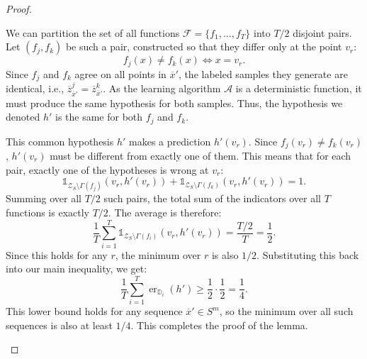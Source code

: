 \begin{proof}
\begin{subproof}
        We can partition the set of all functions $\mathcal{F}=\{f_1, \dots, f_T\}$ into $T/2$ disjoint pairs. Let $(f_j, f_k)$ be such a pair, constructed so that they differ only at the point $v_r$:
        \[
            f_j(x) \neq f_k(x) \iff x = v_r.
        \]
        Since $f_j$ and $f_k$ agree on all points in $\overline{x}'$, the labeled samples they generate are identical, i.e., $\overline{z}_{\overline{x}'}^{j} = \overline{z}_{\overline{x}'}^{k}$. As the learning algorithm $\mathcal{A}$ is a deterministic function, it must produce the same hypothesis for both samples. Thus, the hypothesis we denoted $h'$ is the same for both $f_j$ and $f_k$.

        This common hypothesis $h'$ makes a prediction $h'(v_r)$. Since $f_j(v_r) \neq f_k(v_r)$, $h'(v_r)$ must be different from exactly one of them. This means that for each pair, exactly one of the hypotheses is wrong at $v_r$:
        \[
            \mathds{1}_{\mathcal{Z}_S\setminus\Gamma(f_j)}(v_r, h'(v_r)) + \mathds{1}_{\mathcal{Z}_S\setminus\Gamma(f_k)}(v_r, h'(v_r)) = 1.
        \]
        Summing over all $T/2$ such pairs, the total sum of the indicators over all $T$ functions is exactly $T/2$. The average is therefore:
        \[
            \frac{1}{T}\sum_{i=1}^T \mathds{1}_{\mathcal{Z}_S\setminus\Gamma(f_i)}(v_r, h'(v_r)) = \frac{T/2}{T} = \frac{1}{2}.
        \]
        Since this holds for any $r$, the minimum over $r$ is also $1/2$. Substituting this back into our main inequality, we get:
        \[
            \frac{1}{T}\sum_{i=1}^T\operatorname{er}_{\mathbb{D}_i}(h') \geq \frac{1}{2} \cdot \frac{1}{2} = \frac{1}{4}.
        \]
        This lower bound holds for any sequence $\overline{x}' \in S^m$, so the minimum over all such sequences is also at least $1/4$. This completes the proof of the lemma.
    \end{subproof}


\end{proof}
